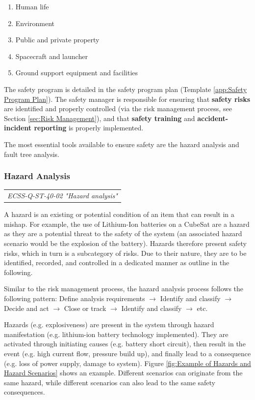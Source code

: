 \begin{enumerate}
\item Human life
\item Environment
\item Public and private property
\item Spacecraft and launcher
\item Ground support equipment and facilities
\end{enumerate}

The safety program is detailed in the safety program plan (Template \ref{app:Safety Program Plan}). The safety manager is responsible for ensuring that \textbf{safety risks} are identified and properly controlled (via the risk management process, see Section \ref{sec:Risk Management}), and that \textbf{safety training} and \textbf{accident-incident reporting} is properly implemented.  

The most essential tools available to ensure safety are the hazard analysis and fault tree analysis.

\subsubsection{Hazard Analysis}

\begin{tabular}{l}
\textit{ECSS-Q-ST-40-02 "Hazard analysis" \cite{ECSS-Q-ST-40-02}}
\end{tabular}

A hazard is an existing or potential condition of an item that can result in a mishap. For example, the use of Lithium-Ion batteries on a CubeSat are a hazard as they are a potential threat to the safety of the system (an associated hazard scenario would be the explosion of the battery). Hazards therefore present safety risks, which in turn is a subcategory of risks. Due to their nature, they are to be identified, recorded, and controlled in a dedicated manner as outline in the following.

Similar to the risk management process, the hazard analysis process follows the following pattern:
Define analysis requirements
$\rightarrow$ Identify and classify
$\rightarrow$ Decide and act
$\rightarrow$ Close or track
$\rightarrow$ Identify and classify
$\rightarrow$ etc.

Hazards (e.g. explosiveness) are present in the system through hazard manifestation (e.g. lithium-ion battery technology implemented). They are activated through initiating causes (e.g. battery short circuit), then result in the event (e.g. high current flow, pressure build up), and finally lead to a consequence (e.g. loss of power supply, damage to system). Figure \ref{fig:Example of Hazards and Hazard Scenarios} shows an example. Different scenarios can originate from the same hazard, while different scenarios can also lead to the same safety consequences.

